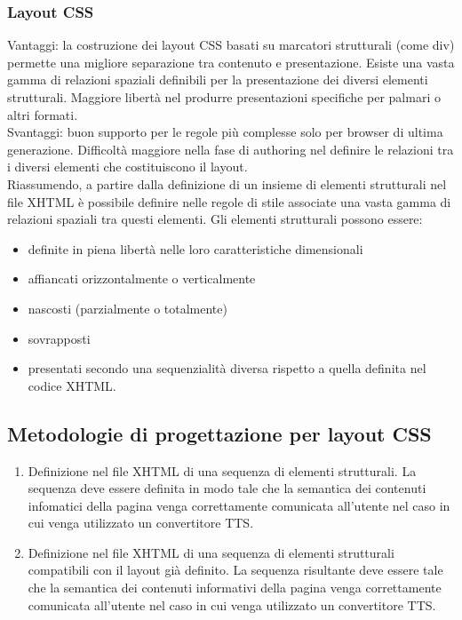 \documentclass{article}
\begin{document}
\subsubsection{Layout CSS}
Vantaggi: la costruzione dei layout CSS basati su marcatori strutturali (come div) permette una migliore separazione tra contenuto e presentazione. Esiste una vasta gamma di relazioni spaziali definibili per la presentazione dei diversi elementi strutturali. Maggiore libertà nel produrre presentazioni specifiche per palmari o altri formati.\\
Svantaggi: buon supporto per le regole più complesse solo per browser di ultima generazione. Difficoltà maggiore nella fase di authoring nel definire le relazioni tra i diversi elementi che costituiscono il layout.\\
Riassumendo, a partire dalla definizione di un insieme di elementi strutturali nel file XHTML è possibile definire nelle regole di stile associate una vasta gamma di relazioni spaziali tra questi elementi. Gli elementi strutturali possono essere:
\begin{itemize}
	\item definite in piena libertà nelle loro caratteristiche dimensionali
	\item affiancati orizzontalmente o verticalmente
	\item nascosti (parzialmente o totalmente)
	\item sovrapposti
	\item presentati secondo una sequenzialità diversa rispetto a quella definita nel codice XHTML.
\end{itemize}
\subsection{Metodologie di progettazione per layout CSS}
\begin{enumerate}
	\item Definizione nel file XHTML di una sequenza di elementi strutturali. La sequenza deve essere definita in modo tale che la semantica dei contenuti infomatici della pagina venga correttamente comunicata all'utente nel caso in cui venga utilizzato un convertitore TTS.
	\item Definizione nel file XHTML di una sequenza di elementi strutturali compatibili con il layout già definito. La sequenza risultante deve essere tale che la semantica dei contenuti informativi della pagina venga correttamente comunicata all'utente nel caso in cui venga utilizzato un convertitore TTS.
\end{enumerate}
\end{document}
